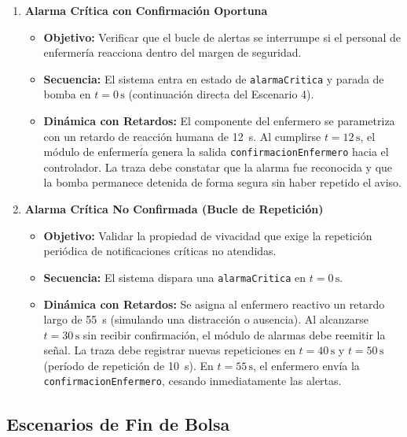\documentclass[11pt,a4paper]{article}
\begin{document}
\begin{enumerate}[label=\textbf{Escenario \arabic*:}, startingvalue=5, leftmargin=*]
    \item \textbf{Alarma Crítica con Confirmación Oportuna}
    \begin{itemize}
        \item \textbf{Objetivo:} Verificar que el bucle de alertas se interrumpe si el personal de enfermería reacciona dentro del margen de seguridad.
        \item \textbf{Secuencia:} El sistema entra en estado de \texttt{alarmaCritica} y parada de bomba en $t = 0\,\text{s}$ (continuación directa del Escenario 4).
        \item \textbf{Dinámica con Retardos:} El componente del enfermero se parametriza con un retardo de reacción humana de \SI{12}{\second}. Al cumplirse $t = 12\,\text{s}$, el módulo de enfermería genera la salida \texttt{confirmacionEnfermero} hacia el controlador. La traza debe constatar que la alarma fue reconocida y que la bomba permanece detenida de forma segura sin haber repetido el aviso.
    \end{itemize}

    \item \textbf{Alarma Crítica No Confirmada (Bucle de Repetición)}
    \begin{itemize}
        \item \textbf{Objetivo:} Validar la propiedad de vivacidad que exige la repetición periódica de notificaciones críticas no atendidas.
        \item \textbf{Secuencia:} El sistema dispara una \texttt{alarmaCritica} en $t = 0\,\text{s}$.
        \item \textbf{Dinámica con Retardos:} Se asigna al enfermero reactivo un retardo largo de \SI{55}{\second} (simulando una distracción o ausencia). Al alcanzarse $t = 30\,\text{s}$ sin recibir confirmación, el módulo de alarmas debe reemitir la señal. La traza debe registrar nuevas repeticiones en $t = 40\,\text{s}$ y $t = 50\,\text{s}$ (período de repetición de \SI{10}{\second}). En $t = 55\,\text{s}$, el enfermero envía la \texttt{confirmacionEnfermero}, cesando inmediatamente las alertas.
    \end{itemize}
\end{enumerate}

\subsection{Escenarios de Fin de Bolsa}
\end{document}
